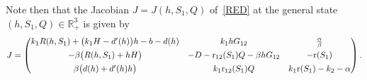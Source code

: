 \documentclass[reqno,11pt]{amsart}
\numberwithin{equation}{section}
\newcommand{\R}{\mathbb{R}}
\newcommand{\rd}{\mathrm{d}}
\begin{document}
Note then that the Jacobian $J=J(h,S_1,Q)$ of~\eqref{RED} at the general state~$(h,S_1,Q)\in\R_+^3$ is given by
{\small
\begin{equation*}%
J=\left(\begin{matrix}
k_1 R(h,S_1)+\big(k_1H-d'(h)\big)h-b-d(h) & k_1 hG_{12} & \frac{\alpha}{\beta}\\[4pt]
-\beta\big(R(h,S_1)+hH\big) & -D-{\rm r}_{12}(S_1)Q-\beta hG_{12} & -{\rm r}(S_1)\\[4pt]
\beta\big(d(h)+d'(h)h\big) & k_1 {\rm r}_{12}(S_1)Q & k_1 {\rm r}(S_1)-k_2-\alpha
\end{matrix}\right) .
\end{equation*}}
\end{document}
